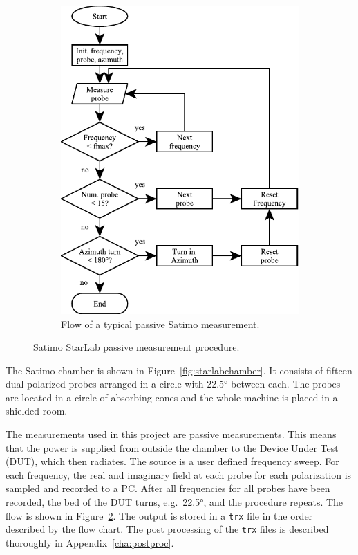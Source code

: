 \begin{figure}[htbp]
\begin{subfigure}[t]{0.49\linewidth}
        \includegraphics{img/analysis/satimoflow}
        \caption{Flow of a typical passive Satimo measurement.}
        \label{fig:satimoflow}
    \end{subfigure}
    \caption{Satimo StarLab passive measurement procedure.}
\end{figure}

The Satimo chamber is shown in Figure~\ref{fig:starlabchamber}. It consists of fifteen dual-polarized probes arranged in a circle with \ang{22.5} between each. The probes are located in a circle of absorbing cones and the whole machine is placed in a shielded room.

The measurements used in this project are passive measurements. This means that the power is supplied from outside the chamber to the Device Under Test (DUT), which then radiates. The source is a user defined frequency sweep. For each frequency, the real and imaginary field at each probe for each polarization is sampled and recorded to a PC. After all frequencies for all probes have been recorded, the bed of the DUT turns, e.g.\ \ang{22.5}, and the procedure repeats. The flow is shown in Figure~\ref{fig:satimoflow}. The output is stored in a \texttt{trx} file in the order described by the flow chart. The post processing of the \texttt{trx} files is described thoroughly in Appendix~\ref{cha:postproc}.

